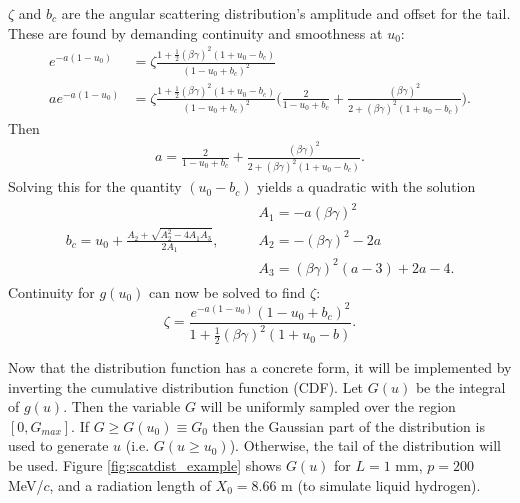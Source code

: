 $\zeta$ and $b_c$ are the angular scattering distribution's amplitude and offset for the tail. These are found by demanding continuity and smoothness at $u_0$:
\begin{align*}
e^{-a(1-u_0)}&=\zeta\frac{1+\frac{1}{2}(\beta\gamma)^2(1+u_0-b_c)}{(1-u_0+b_c)^2}\\
ae^{-a(1-u_0)}&=\zeta\frac{1+\frac{1}{2}(\beta\gamma)^2(1+u_0-b_c)}{(1-u_0+b_c)^2} \Big(\frac{2}{1-u_0+b_c}+\frac{(\beta\gamma)^2}{2+(\beta\gamma)^2(1+u_0-b_c)}\Big).
\end{align*}
Then
\begin{align*}
a=\frac{2}{1-u_0+b_c}+\frac{(\beta\gamma)^2}{2+(\beta\gamma)^2(1+u_0-b_c)}.
\end{align*}
Solving this for the quantity $(u_0-b_c)$ yields a quadratic with the solution
\begin{align} \label{eqn:cosybc}
\begin{split}
& A_1=-a(\beta\gamma)^2\\
b_c=u_0+\frac{A_2 + \sqrt{A_2 ^2 - 4A_1 A_3}}{2A_1}, \qquad &A_2=-(\beta\gamma)^2-2a \\
&A_3=(\beta\gamma)^2(a-3)+2a-4.
\end{split}
\end{align}
Continuity for $g(u_0)$ can now be solved to find $\zeta$:
\begin{equation}\label{eqn:cosyzeta}
\zeta=\frac{e^{-a(1-u_0)}(1-u_0+b_c)^2}{1+\frac{1}{2}(\beta\gamma)^2(1+u_0-b)}.
\end{equation}

Now that the distribution function has a concrete form, it will be implemented by inverting the cumulative distribution function (CDF).  Let $G(u)$ be the integral of $g(u)$. Then the variable $G$ will be uniformly sampled over the region $[0,G_{max}]$. If $G\geq G(u_0) \equiv G_0$ then the Gaussian part of the distribution is used to generate $u$ (i.e. $G(u\geq u_0)$). Otherwise, the tail of the distribution will be used. Figure \ref{fig:scatdist_example} shows $G(u)$ for $L=1$ mm, $p=200$ MeV/$c$, and a radiation length of $X_0 = 8.66$ m (to simulate liquid hydrogen).

